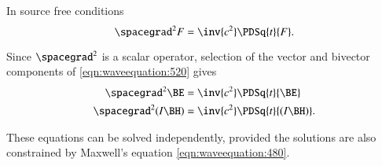 %
%
%
In source free conditions
\begin{dmath}\label{eqn:waveequation:520}
\spacegrad^2 F = \inv{c^2} \PDSq{t}{F}.
\end{dmath}

Since \( \spacegrad^2 \) is a scalar operator, selection of the vector and bivector components of \cref{eqn:waveequation:520} gives
\begin{dmath}\label{eqn:waveequation:540}
\begin{aligned}
\spacegrad^2 \BE &= \inv{c^2} \PDSq{t}{\BE} \\
\spacegrad^2 (I \BH) &= \inv{c^2} \PDSq{t}{(I \BH)}.
\end{aligned}
\end{dmath}

These equations can be solved independently, provided the solutions are also constrained by Maxwell's equation \cref{eqn:waveequation:480}.
